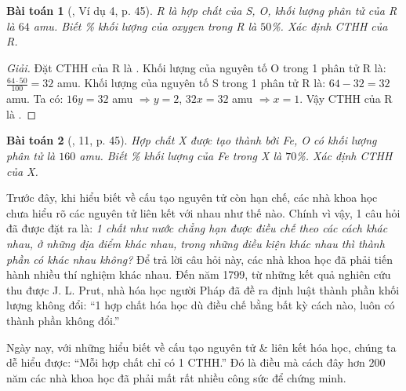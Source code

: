\documentclass{article}
\newtheorem{baitoan}{Bài toán}
\begin{document}
\begin{baitoan}[\cite{SGK_KHTN_7_Canh_Dieu}, Ví dụ 4, p. 45]
	R là hợp chất của \emph{S, O}, khối lượng phân tử của R là $64$ amu. Biết \% khối lượng của oxygen trong R là $50$\%. Xác định CTHH của R.
\end{baitoan}

\begin{proof}[Giải]
	Đặt CTHH của R là . Khối lượng của nguyên tố O trong 1 phân tử R là: $\frac{64\cdot50}{100} = 32$ amu. Khối lượng của nguyên tố S trong 1 phân tử R là: $64 - 32 = 32$ amu. Ta có: $16y = 32$ amu $\Rightarrow y = 2$, $32x = 32$ amu $\Rightarrow x = 1$. Vậy CTHH của R là .
\end{proof}

\begin{baitoan}[\cite{SGK_KHTN_7_Canh_Dieu}, 11, p. 45]
	Hợp chất X được tạo thành bởi \emph{Fe, O} có khối lượng phân tử là $160$ amu. Biết \% khối lượng của \emph{Fe} trong X là $70$\%. Xác định CTHH của X.
\end{baitoan}
Trước đây, khi hiểu biết về cấu tạo nguyên tử còn hạn chế, các nhà khoa học chưa hiểu rõ các nguyên tử liên kết với nhau như thế nào. Chính vì vậy, 1 câu hỏi đã được đặt ra là: \textit{1 chất như nước chẳng hạn được điều chế theo các cách khác nhau, ở những địa điểm khác nhau, trong những điều kiện khác nhau thì thành phần có khác nhau không?} Để trả lời câu hỏi này, các nhà khoa học đã phải tiến hành nhiều thí nghiệm khác nhau. Đến năm 1799, từ những kết quả nghiên cứu thu được J. L. Prut, nhà hóa học người Pháp đã đề ra định luật thành phần khối lượng không đổi: ``1 hợp chất hóa học dù điều chế bằng bất kỳ cách nào, luôn có thành phần không đổi.''

Ngày nay, với những hiểu biết về cấu tạo nguyên tử \& liên kết hóa học, chúng ta dễ hiểu được: ``Mỗi hợp chất chỉ có 1 CTHH.'' Đó là điều mà cách đây hơn $200$ năm các nhà khoa học đã phải mất rất nhiều công sức để chứng minh.

\noindent{}
\end{document}
